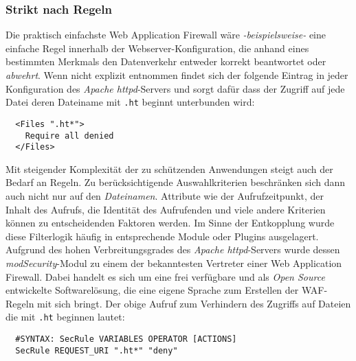 \subsubsection{Strikt nach Regeln}

Die praktisch einfachste Web Application Firewall wäre \emph{-beispielsweise-} eine einfache Regel innerhalb der Webserver-Konfiguration, die anhand eines bestimmten Merkmals den Datenverkehr entweder korrekt beantwortet oder \glqq\emph{abwehrt}\grqq. Wenn nicht explizit entnommen findet sich der folgende Eintrag in jeder Konfiguration des \emph{Apache httpd}-Servers und sorgt dafür dass der Zugriff auf jede Datei deren Dateiname mit \texttt{.ht} beginnt unterbunden wird:

\begin{lstlisting}
  <Files ".ht*">
    Require all denied
  </Files>
\end{lstlisting}

Mit steigender Komplexität der zu schützenden Anwendungen steigt auch der Bedarf an Regeln. Zu berücksichtigende Auswahlkriterien beschränken sich dann auch nicht nur auf den \glqq\emph{Dateinamen}\grqq. Attribute wie der Aufrufzeitpunkt, der Inhalt des Aufrufs, die Identität des Aufrufenden und viele andere Kriterien können zu entscheidenden Faktoren werden. Im Sinne der Entkopplung wurde diese Filterlogik häufig in entsprechende Module oder Plugins ausgelagert. Aufgrund des hohen Verbreitungsgrades des \emph{Apache httpd}-Servers wurde dessen \emph{modSecurity}-Modul zu einem der bekanntesten Vertreter einer Web Application Firewall. Dabei handelt es sich um eine frei verfügbare und als \emph{Open Source} entwickelte Softwarelösung, die eine eigene Sprache zum Erstellen der WAF-Regeln mit sich bringt. Der obige Aufruf zum Verhindern des Zugriffs auf Dateien die mit \texttt{.ht} beginnen lautet:

\begin{lstlisting}
  #SYNTAX: SecRule VARIABLES OPERATOR [ACTIONS]        
  SecRule REQUEST_URI ".ht*" "deny"
\end{lstlisting}

